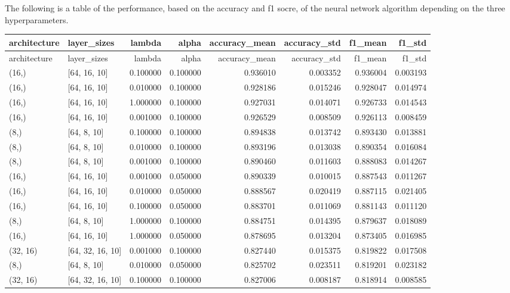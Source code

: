 \documentclass{article}
\begin{document}
The following is a table of the performance, based on the accuracy and f1 socre, of the neural network algorithm depending on the three hyperparameters.  
\begin{longtable}{llrrrrrr}
\toprule
architecture & layer\_sizes & lambda & alpha & accuracy\_mean & accuracy\_std & f1\_mean & f1\_std \\
\midrule
\endfirsthead

\toprule
architecture & layer\_sizes & lambda & alpha & accuracy\_mean & accuracy\_std & f1\_mean & f1\_std \\
\midrule
\endhead

\bottomrule
\endfoot

\bottomrule
\endlastfoot
(16,) & [64, 16, 10] & 0.100000 & 0.100000 & 0.936010 & 0.003352 & 0.936004 & 0.003193 \\
(16,) & [64, 16, 10] & 0.010000 & 0.100000 & 0.928186 & 0.015246 & 0.928047 & 0.014974 \\
(16,) & [64, 16, 10] & 1.000000 & 0.100000 & 0.927031 & 0.014071 & 0.926733 & 0.014543 \\
(16,) & [64, 16, 10] & 0.001000 & 0.100000 & 0.926529 & 0.008509 & 0.926113 & 0.008459 \\
(8,) & [64, 8, 10] & 0.100000 & 0.100000 & 0.894838 & 0.013742 & 0.893430 & 0.013881 \\
(8,) & [64, 8, 10] & 0.010000 & 0.100000 & 0.893196 & 0.013038 & 0.890354 & 0.016084 \\
(8,) & [64, 8, 10] & 0.001000 & 0.100000 & 0.890460 & 0.011603 & 0.888083 & 0.014267 \\
(16,) & [64, 16, 10] & 0.001000 & 0.050000 & 0.890339 & 0.010015 & 0.887543 & 0.011267 \\
(16,) & [64, 16, 10] & 0.010000 & 0.050000 & 0.888567 & 0.020419 & 0.887115 & 0.021405 \\
(16,) & [64, 16, 10] & 0.100000 & 0.050000 & 0.883701 & 0.011069 & 0.881143 & 0.011120 \\
(8,) & [64, 8, 10] & 1.000000 & 0.100000 & 0.884751 & 0.014395 & 0.879637 & 0.018089 \\
(16,) & [64, 16, 10] & 1.000000 & 0.050000 & 0.878695 & 0.013204 & 0.873405 & 0.016985 \\
(32, 16) & [64, 32, 16, 10] & 0.001000 & 0.100000 & 0.827440 & 0.015375 & 0.819822 & 0.017508 \\
(8,) & [64, 8, 10] & 0.010000 & 0.050000 & 0.825702 & 0.023511 & 0.819201 & 0.023182 \\
(32, 16) & [64, 32, 16, 10] & 0.100000 & 0.100000 & 0.827006 & 0.008187 & 0.818914 & 0.008585 \\

\end{longtable}
\end{document}
